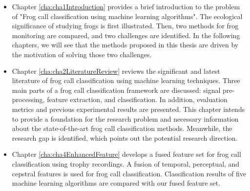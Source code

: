 \begin{itemize}


\item  Chapter \ref{cha:cha1Introduction} provides a brief introduction to the problem of "Frog call classification using machine learning algorithms".
The ecological significance of studying frogs is first illustrated. Then, two methods for frog monitoring are compared, and two challenges are identified. In the following chapters, we will see that the methods proposed in this thesis are driven by the motivation of solving those two challenges.


\item Chapter \ref{cha:cha2LiteratureReview} reviews the significant and latest literature of frog call classification using machine learning techniques. Three main parts of a frog call classification framework are discussed: signal pre-processing, feature extraction, and classification. 
In addition, evaluation metrics and previous experimental results are presented. This chapter intends to provide a foundation for the research problem and necessary information about the state-of-the-art frog call classification methods. Meanwhile, the research gap is identified, which points out the potential research direction.


\item Chapter \ref{cha:cha4EnhancedFeature} develops a fused feature set for frog call classification using trophy recordings. A fusion of temporal, perceptual, and cepstral features is used for frog call classification. Classification results of five machine learning algorithms are compared with our fused feature set. 




\end{itemize}
